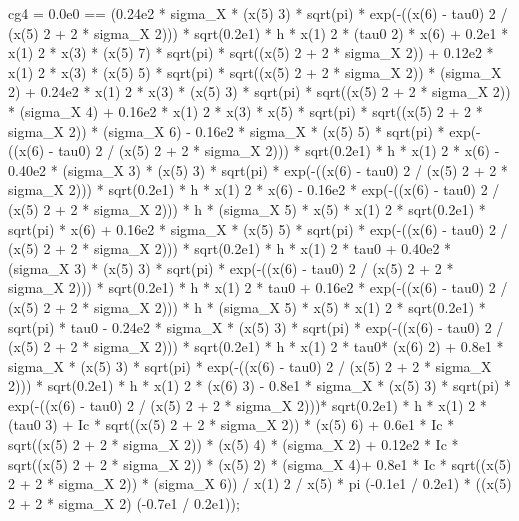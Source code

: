 \begin{maplegroup}
cg4 = 0.0e0 == (0.24e2 * sigma\_X * (x(5)  3) * sqrt(pi) * exp(-((x(6) - tau0)  2 / (x(5)  2 + 2 * sigma\_X  2))) * sqrt(0.2e1) * h * x(1)  2 * (tau0  2) * x(6) + 0.2e1 * x(1)  2 * x(3) * (x(5)  7) * sqrt(pi) * sqrt((x(5)  2 + 2 * sigma\_X  2)) + 0.12e2 * x(1)  2 * x(3) * (x(5)  5) * sqrt(pi) * sqrt((x(5)  2 + 2 * sigma\_X  2)) * (sigma\_X  2) + 0.24e2 * x(1)  2 * x(3) * (x(5)  3) * sqrt(pi) * sqrt((x(5)  2 + 2 * sigma\_X  2)) * (sigma\_X  4) + 0.16e2 * x(1)  2 * x(3) * x(5) * sqrt(pi) * sqrt((x(5)  2 + 2 * sigma\_X  2)) * (sigma\_X  6) - 0.16e2 * sigma\_X * (x(5)  5) * sqrt(pi) * exp(-((x(6) - tau0)  2 / (x(5)  2 + 2 * sigma\_X  2))) * sqrt(0.2e1) * h * x(1)  2 * x(6) - 0.40e2 * (sigma\_X  3) * (x(5)  3) * sqrt(pi) * exp(-((x(6) - tau0) 2 / (x(5)  2 + 2 * sigma\_X  2))) * sqrt(0.2e1) * h * x(1)  2 * x(6) - 0.16e2 * exp(-((x(6) - tau0)  2 / (x(5)  2 + 2 * sigma\_X  2))) * h * (sigma\_X  5) * x(5) * x(1)  2 * sqrt(0.2e1) * sqrt(pi) * x(6) + 0.16e2 * sigma\_X * (x(5)  5) * sqrt(pi) * exp(-((x(6) - tau0)  2 / (x(5)  2 + 2 * sigma\_X  2))) * sqrt(0.2e1) * h * x(1)  2 * tau0 + 0.40e2 * (sigma\_X  3) * (x(5)  3) * sqrt(pi) * exp(-((x(6) - tau0)  2 / (x(5)  2 + 2 * sigma\_X  2))) * sqrt(0.2e1) * h * x(1)  2 * tau0 + 0.16e2 * exp(-((x(6) - tau0)  2 / (x(5)  2 + 2 * sigma\_X  2))) * h * (sigma\_X  5) * x(5) * x(1)  2 * sqrt(0.2e1) * sqrt(pi) * tau0 - 0.24e2 * sigma\_X * (x(5)  3) * sqrt(pi) * exp(-((x(6) - tau0)  2 / (x(5)  2 + 2 * sigma\_X  2))) * sqrt(0.2e1) * h * x(1)  2 * tau0* (x(6)  2) + 0.8e1 * sigma\_X * (x(5)  3) * sqrt(pi) * exp(-((x(6) - tau0)  2 / (x(5)  2 + 2 * sigma\_X  2))) * sqrt(0.2e1) * h * x(1)  2 * (x(6)  3) - 0.8e1 * sigma\_X * (x(5)  3) * sqrt(pi) * exp(-((x(6) - tau0)  2 / (x(5)  2 + 2 * sigma\_X  2)))* sqrt(0.2e1) * h * x(1)  2 * (tau0  3) + Ic * sqrt((x(5)  2 + 2 * sigma\_X  2)) * (x(5)  6) + 0.6e1 * Ic * sqrt((x(5)  2 + 2 * sigma\_X  2)) * (x(5)  4) * (sigma\_X  2) + 0.12e2 * Ic * sqrt((x(5)  2 + 2 * sigma\_X  2)) * (x(5)  2) * (sigma\_X  4)+ 0.8e1 * Ic * sqrt((x(5)  2 + 2 * sigma\_X  2)) * (sigma\_X  6)) / x(1)  2 / x(5) * pi  (-0.1e1 / 0.2e1) * ((x(5)  2 + 2 * sigma\_X  2)  (-0.7e1 / 0.2e1));
\end{maplegroup}
